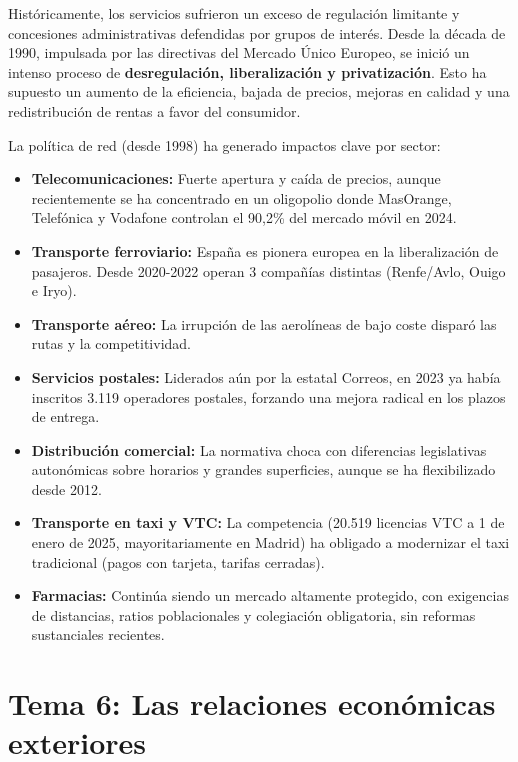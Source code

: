 Históricamente, los servicios sufrieron un exceso de regulación limitante y concesiones administrativas defendidas por grupos de interés. Desde la década de 1990, impulsada por las directivas del Mercado Único Europeo, se inició un intenso proceso de \textbf{desregulación, liberalización y privatización}. Esto ha supuesto un aumento de la eficiencia, bajada de precios, mejoras en calidad y una redistribución de rentas a favor del consumidor.

La política de red (desde 1998) ha generado impactos clave por sector:

\begin{itemize}
  \item \textbf{Telecomunicaciones:} Fuerte apertura y caída de precios, aunque recientemente se ha concentrado en un oligopolio donde MasOrange, Telefónica y Vodafone controlan el 90,2\% del mercado móvil en 2024.
  \item \textbf{Transporte ferroviario:} España es pionera europea en la liberalización de pasajeros. Desde 2020-2022 operan 3 compañías distintas (Renfe/Avlo, Ouigo e Iryo).
  \item \textbf{Transporte aéreo:} La irrupción de las aerolíneas de bajo coste disparó las rutas y la competitividad.
  \item \textbf{Servicios postales:} Liderados aún por la estatal Correos, en 2023 ya había inscritos 3.119 operadores postales, forzando una mejora radical en los plazos de entrega.
  \item \textbf{Distribución comercial:} La normativa choca con diferencias legislativas autonómicas sobre horarios y grandes superficies, aunque se ha flexibilizado desde 2012.
  \item \textbf{Transporte en taxi y VTC:} La competencia (20.519 licencias VTC a 1 de enero de 2025, mayoritariamente en Madrid) ha obligado a modernizar el taxi tradicional (pagos con tarjeta, tarifas cerradas).
  \item \textbf{Farmacias:} Continúa siendo un mercado altamente protegido, con exigencias de distancias, ratios poblacionales y colegiación obligatoria, sin reformas sustanciales recientes.
\end{itemize}
 
\clearpage

\section*{Tema 6: Las relaciones económicas exteriores}

